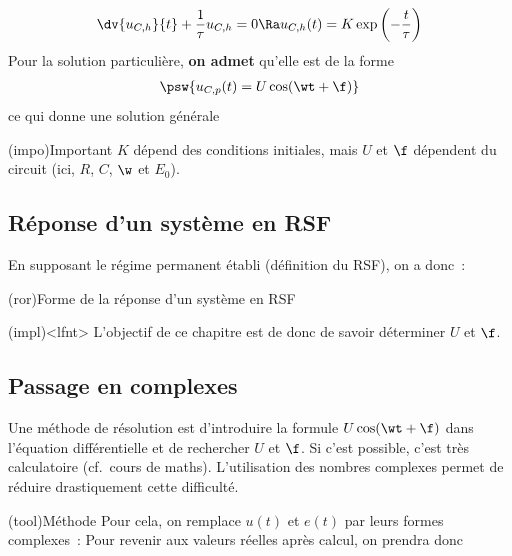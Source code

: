 \documentclass[../../main/main.tex]{subfiles}
\begin{document}
\begin{gather*}
	\dv{u_{C,h}}{t} + \frac{1}{\tau}u_{C,h} = 0
	\Ra
	u_{C,h}(t) = K\exp \left( - \frac{t}{\tau} \right)
\end{gather*}
Pour la solution particulière, \textbf{on admet} qu'elle est de la forme
\begin{gather*}
	\psw{
		u_{C,p}(t) = U\cos(\wt + \f)
	}
\end{gather*}
ce qui donne une solution générale
\psw{
	\[\boxed{u_C(t) = K\exp \left( - \frac{t}{\tau} \right) + U\cos(\wt + \f)}\]
}
\vspace{-15pt}
\begin{tcb}[label=ror:CIounon](impo){Important}
	$K$ dépend des conditions initiales, mais
	\smallbreak \centering\large
	$U$ et $\f$ dépendent du circuit (ici, $R$, $C$, $\w$ et $E_0$).
\end{tcb}

\subsection{Réponse d'un système en RSF}
En supposant le régime permanent établi (définition du RSF), on a donc~:
\begin{tcb}[label=prop:sortiersf](ror){Forme de la réponse d'un système en RSF}
\end{tcb}
\begin{tcb}(impl)<lfnt>{}
	L'objectif de ce chapitre est de donc de savoir déterminer $U$ et $\f$.
\end{tcb}
\subsection{Passage en complexes}
Une méthode de résolution est d'introduire la formule $U\cos(\wt+\f)$ dans
l'équation différentielle et de rechercher $U$ et $\f$. Si c'est possible, c'est
très calculatoire (cf.\ cours de maths). L'utilisation des nombres complexes
permet de réduire drastiquement cette difficulté.

\begin{tcb}(tool){Méthode}
	Pour cela, on remplace $u(t)$ et $e(t)$ par leurs formes complexes~:
	Pour revenir aux valeurs réelles après calcul, on prendra donc
\end{tcb}
\end{document}
